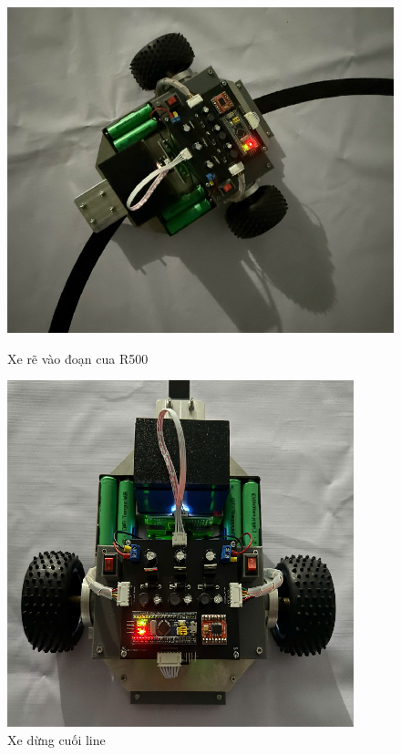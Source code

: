                \begin{figure}[H]
                    \centering
                    \begin{minipage}{0.5\textwidth}
                         \centering
                         \includegraphics[width=\linewidth]{pictures/chapter8/turn.png}
                         \caption{Xe rẽ vào đoạn cua R500}
                         \label{fig:chapter8:1.2 - 1}
                    \end{minipage}\hfill
                    \begin{minipage}{0.42\textwidth}
                         \centering
                         \includegraphics[width=\linewidth]{pictures/chapter8/end.png}
                         \caption{Xe dừng cuối line}
                         \label{fig:chapter8:1.2 - 4}
                    \end{minipage}
                    \vspace{0.5cm}


\end{figure}
